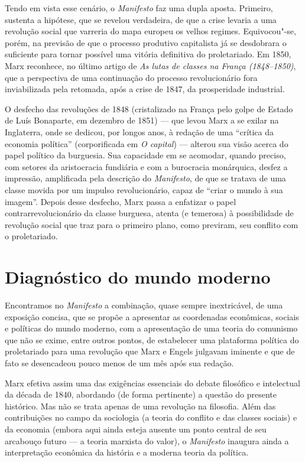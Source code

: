 Tendo em vista esse cenário, o \textit{Manifesto} faz uma dupla aposta.
Primeiro, sustenta a hipótese, que se revelou verdadeira, de que a
crise levaria a uma revolução social que varreria do mapa europeu os
velhos regimes. Equivocou"-se, porém, na previsão de que o processo
produtivo capitalista já se desdobrara o suficiente para tornar
possível uma vitória definitiva do proletariado. Em 1850, Marx reconhece, no último artigo de\textit{ As lutas de classes na França 
(1848--1850)}, que a perspectiva de uma continuação do processo
revolucionário fora inviabilizada pela retomada, após a crise de 1847,
da prosperidade industrial.

O desfecho das revoluções de 1848 (cristalizado na França pelo golpe de
Estado de Luís Bonaparte, em dezembro de 1851) --- que levou Marx a se
exilar na Inglaterra, onde se dedicou, por longos anos, à redação de
uma “crítica da economia política” (corporificada em \textit{O
capital}) --- alterou sua visão acerca do papel político da burguesia.
Sua capacidade em se acomodar, quando preciso, com setores da
aristocracia fundiária e com a burocracia monárquica, desfez a
impressão, amplificada pela descrição do \textit{Manifesto}, de que se
tratava de uma classe movida por um impulso revolucionário, capaz de
“criar o mundo à sua imagem”. Depois desse desfecho, Marx passa a
enfatizar o papel contrarrevolucionário da classe burguesa, atenta (e
temerosa) à possibilidade de revolução social que traz para o primeiro
plano, como previram, seu conflito com o proletariado.

\section*{Diagnóstico do mundo moderno}

Encontramos no \textit{Manifesto} a combinação, quase sempre
inextricável, de uma exposição concisa, que se propõe a apresentar as
coordenadas econômicas, sociais e políticas do mundo moderno, com a
apresentação de uma teoria do comunismo que não se exime, entre outros
pontos, de estabelecer uma plataforma política do proletariado para uma
revolução que Marx e Engels julgavam iminente e que de fato se
desencadeou pouco menos de um mês após sua redação.

Marx efetiva assim uma das exigências essenciais do debate filosófico e
intelectual da década de 1840, abordando (de forma pertinente) a
questão do presente histórico. Mas não se trata apenas de uma revolução
na filosofia. Além das contribuições no campo da sociologia (a teoria
do conflito e das classes sociais) e da economia (embora aqui ainda
esteja ausente um ponto central de seu arcabouço futuro --- a teoria
marxista do valor), o \textit{Manifesto} inaugura ainda a
interpretação econômica da história e a moderna teoria da política.

